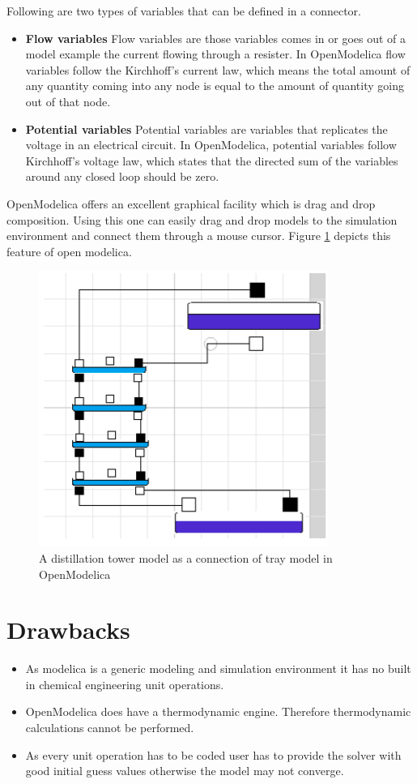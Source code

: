 \documentclass[12pt]{report}
\begin{document}
Following are two types of variables that can be defined in a connector.
\begin{itemize}
\item {\textbf{Flow variables}}
Flow variables are those variables comes in or goes out of a model example the current flowing through a resister. In OpenModelica flow variables follow the Kirchhoff's current law, which means the total amount of any quantity coming into any node is equal to the amount of quantity going out of that node.
\item{\textbf{Potential variables}}
Potential variables are variables that replicates the voltage in an electrical circuit. In OpenModelica, potential variables follow Kirchhoff's voltage law, which states that the directed sum of the variables around any closed loop should be zero.
\end{itemize}

OpenModelica offers an excellent graphical facility which is drag and drop composition. Using this one can easily drag and drop models to the simulation environment and connect them through a mouse cursor. Figure \ref{Dist} depicts this feature of open modelica.

\begin{figure}
\centering
\includegraphics[width = 0.6\linewidth]{Dist}
\caption{A distillation tower model as a connection of tray model in OpenModelica}
\label{Dist}
\end{figure}

\section{Drawbacks}
\begin{itemize}
\item {As modelica is a generic modeling and simulation environment it has no built in chemical engineering unit operations.}
\item{OpenModelica does have a thermodynamic engine. Therefore thermodynamic calculations cannot be performed.}
\item{As every unit operation has to be coded user has to provide the solver with good initial guess values otherwise the model may not converge.}
\end{itemize}
\end{document}
